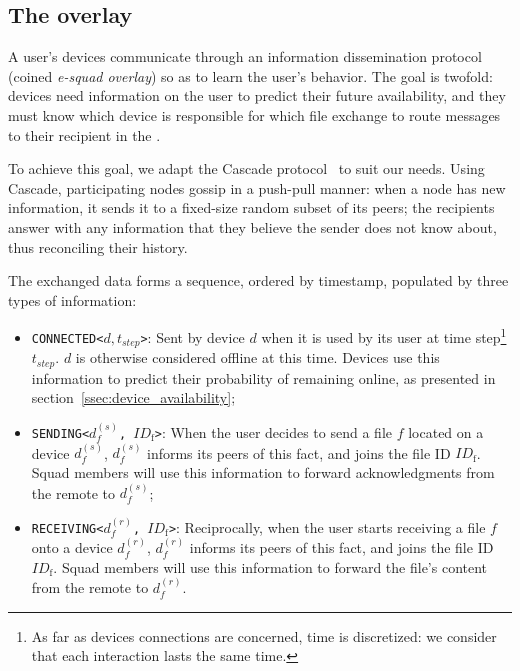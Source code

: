 
\newcommand\fileid{\ensuremath{ID_{\text{f}}}\xspace}
\newcommand\sendingdevice{\ensuremath{d^{(s)}_f}\xspace}
\newcommand\recdevice{\ensuremath{d^{(r)}_f}\xspace}

\subsection{The \squad overlay}
\label{sec:squad_overlay}

A user's devices communicate through an information dissemination protocol (coined \emph{e-squad overlay}) so as to learn the user's behavior.
The goal is twofold: 
devices need information on the user to predict their future availability, 
and they must know which device is responsible for which file exchange to route messages to their recipient in the \squad.

To achieve this goal, we adapt the Cascade protocol~\cite{luxey:cascade} to suit our needs. 
Using Cascade, participating nodes gossip in a push-pull manner: 
when a node has new information, it sends it to a fixed-size random subset of its peers; 
the recipients answer with any information that they believe the sender does not know about, thus reconciling their history.

The exchanged data forms a sequence, ordered by timestamp, populated by three types of information:
\begin{itemize}
	\item \texttt{CONNECTED<$d, t_{step}$>}: Sent by device $d$ when it is used by its user at time step\footnote{As far as devices connections are concerned, time is discretized: we consider that each interaction lasts the same time.} $t_{step}$. $d$ is otherwise considered offline at this time. Devices use this information to predict their probability of remaining online, as presented in section~\ref{ssec:device_availability};
	\item \texttt{SENDING<\sendingdevice, \fileid>}: When the user decides to send a file $f$ located on a device \sendingdevice, \sendingdevice informs its peers of this fact, and joins the file ID \fileid. Squad members will use this information to forward acknowledgments from the remote to \sendingdevice;
	\item \texttt{RECEIVING<\recdevice, \fileid>}: Reciprocally, when the user starts receiving a file $f$ onto a device \recdevice, \recdevice informs its peers of this fact, and joins the file ID \fileid. Squad members will use this information to forward the file's content from the remote to \recdevice.
\end{itemize}

